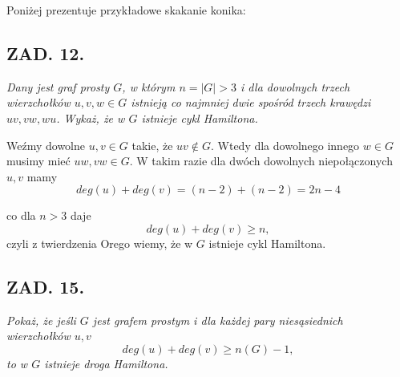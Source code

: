 \documentclass{article}
\begin{document}
Poniżej prezentuje przykładowe skakanie konika:

\begin{center}
\end{center}

\subsection*{ZAD. 12.}
\emph{Dany jest graf prosty $G$, w którym $n=|G|>3$ i dla dowolnych trzech wierzchołków $u,v,w\in G$ istnieją co najmniej dwie spośród trzech krawędzi $uv,vw,wu$. Wykaż, że w $G$ istnieje cykl Hamiltona.}
\medskip

\medskip

Weźmy dowolne $u,v\in G$ takie, że $uv\not\in G$. Wtedy dla dowolnego innego $w\in G$ musimy mieć $uw, vw\in G$. W takim razie dla dwóch dowolnych niepołączonych $u,v$ mamy
$$deg(u)+deg(v)=(n-2)+(n-2)=2n-4$$

co dla $n>3$ daje
$$deg(u)+deg(v)\geq n,$$
czyli z twierdzenia Orego wiemy, że w $G$ istnieje cykl Hamiltona.

\subsection*{ZAD. 15.}
\emph{Pokaż, że jeśli $G$ jest grafem prostym i dla każdej pary niesąsiednich wierzchołków $u,v$}
$$deg(u)+deg(v)\geq n(G)-1,$$
\emph{to w $G$ istnieje droga Hamiltona.}
\medskip
\end{document}

